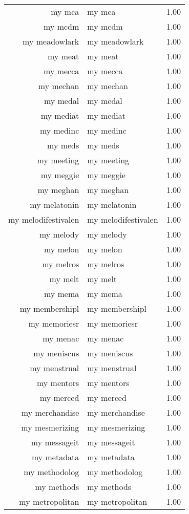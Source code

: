 \begin{table}[ht]
\begin{tabular}{rlr}
  my mca & my mca & 1.00 \\ 
  my mcdm & my mcdm & 1.00 \\ 
  my meadowlark & my meadowlark & 1.00 \\ 
  my meat & my meat & 1.00 \\ 
  my mecca & my mecca & 1.00 \\ 
  my mechan & my mechan & 1.00 \\ 
  my medal & my medal & 1.00 \\ 
  my mediat & my mediat & 1.00 \\ 
  my medinc & my medinc & 1.00 \\ 
  my meds & my meds & 1.00 \\ 
  my meeting & my meeting & 1.00 \\ 
  my meggie & my meggie & 1.00 \\ 
  my meghan & my meghan & 1.00 \\ 
  my melatonin & my melatonin & 1.00 \\ 
  my melodifestivalen & my melodifestivalen & 1.00 \\ 
  my melody & my melody & 1.00 \\ 
  my melon & my melon & 1.00 \\ 
  my melros & my melros & 1.00 \\ 
  my melt & my melt & 1.00 \\ 
  my mema & my mema & 1.00 \\ 
  my membershipl & my membershipl & 1.00 \\ 
  my memoriesr & my memoriesr & 1.00 \\ 
  my menac & my menac & 1.00 \\ 
  my meniscus & my meniscus & 1.00 \\ 
  my menstrual & my menstrual & 1.00 \\ 
  my mentors & my mentors & 1.00 \\ 
  my merced & my merced & 1.00 \\ 
  my merchandise & my merchandise & 1.00 \\ 
  my mesmerizing & my mesmerizing & 1.00 \\ 
  my messageit & my messageit & 1.00 \\ 
  my metadata & my metadata & 1.00 \\ 
  my methodolog & my methodolog & 1.00 \\ 
  my methods & my methods & 1.00 \\ 
  my metropolitan & my metropolitan & 1.00 \\ 

\end{tabular}
\end{table}
